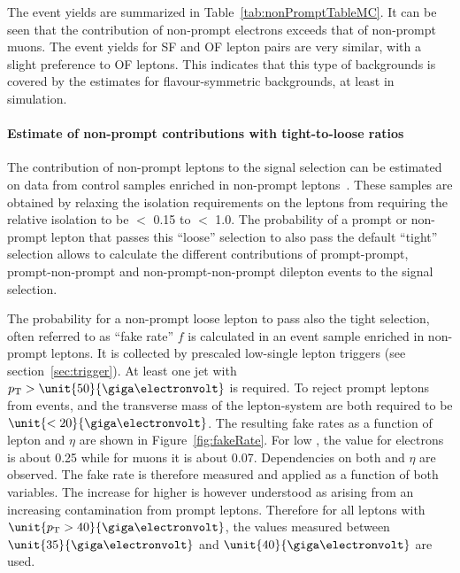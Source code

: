 The event yields are summarized in Table~\ref{tab:nonPromptTableMC}. It can be seen that the contribution of non-prompt electrons exceeds that of non-prompt muons. The event yields for SF and OF lepton pairs are very similar, with a slight preference to OF leptons. This indicates that this type of backgrounds is covered by the estimates for flavour-symmetric backgrounds, at least in simulation.


\paragraph*{Estimate of non-prompt contributions with tight-to-loose ratios}
The contribution of non-prompt leptons to the signal selection can be estimated on data from control samples enriched in non-prompt leptons~\cite{fakesnote1,fakesnote2}. These samples are obtained by relaxing the isolation requirements on the leptons from requiring the relative isolation to be $<$ 0.15 to $<$ 1.0. The probability of a prompt or non-prompt lepton that passes this ``loose'' selection to also pass the default ``tight'' selection allows to calculate the different contributions of prompt-prompt, prompt-non-prompt and non-prompt-non-prompt dilepton events to the signal selection. 

The probability for a non-prompt loose lepton to pass also the tight selection, often referred to as ``fake rate'' $f$ is calculated in an event sample enriched in non-prompt leptons. It is collected by prescaled low-\pt single lepton triggers (see section~\ref{sec:trigger}). At least one jet with $\pt > \unit{50}{\giga\electronvolt}$ is required. To reject prompt leptons from \Wjets events, \MET and the transverse mass of the lepton-\MET system are both required to be $\unit{<20}{\giga\electronvolt}$. The resulting fake rates as a function of lepton \pt and $\eta$ are shown in Figure~\ref{fig:fakeRate}. For low \pt, the value for electrons is about 0.25 while for muons it is about 0.07. Dependencies on both \pt and $\eta$ are observed. The fake rate is therefore measured and applied as a function of both variables. The increase for higher \pt is however understood as arising from an increasing contamination from prompt leptons. Therefore for all leptons with $\unit{\pt > 40}{\giga\electronvolt}$, the values measured between $\unit{35}{\giga\electronvolt}$ and $\unit{40}{\giga\electronvolt}$ are used.  

